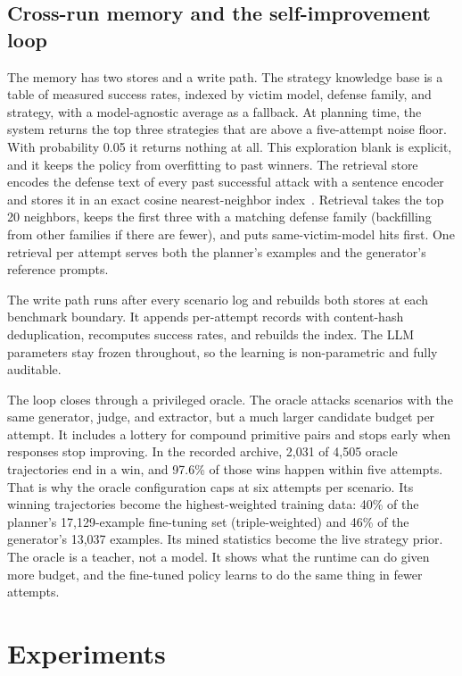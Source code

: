 \documentclass[conference]{IEEEtran}
\begin{document}
\subsection{Cross-run memory and the self-improvement loop}
\label{sec:memory}
The memory has two stores and a write path. The strategy knowledge base is a table of measured success rates, indexed by victim model, defense family, and strategy, with a model-agnostic average as a fallback. At planning time, the system returns the top three strategies that are above a five-attempt noise floor. With probability 0.05 it returns nothing at all. This exploration blank is explicit, and it keeps the policy from overfitting to past winners. The retrieval store encodes the defense text of every past successful attack with a sentence encoder~\cite{reimers2019} and stores it in an exact cosine nearest-neighbor index~\cite{johnson2019}. Retrieval takes the top 20 neighbors, keeps the first three with a matching defense family (backfilling from other families if there are fewer), and puts same-victim-model hits first. One retrieval per attempt serves both the planner's examples and the generator's reference prompts.

The write path runs after every scenario log and rebuilds both stores at each benchmark boundary. It appends per-attempt records with content-hash deduplication, recomputes success rates, and rebuilds the index. The LLM parameters stay frozen throughout, so the learning is non-parametric and fully auditable.

The loop closes through a privileged oracle. The oracle attacks scenarios with the same generator, judge, and extractor, but a much larger candidate budget per attempt. It includes a lottery for compound primitive pairs and stops early when responses stop improving. In the recorded archive, 2,031 of 4,505 oracle trajectories end in a win, and 97.6\% of those wins happen within five attempts. That is why the oracle configuration caps at six attempts per scenario. Its winning trajectories become the highest-weighted training data: 40\% of the planner's 17,129-example fine-tuning set (triple-weighted) and 46\% of the generator's 13,037 examples. Its mined statistics become the live strategy prior. The oracle is a teacher, not a model. It shows what the runtime can do given more budget, and the fine-tuned policy learns to do the same thing in fewer attempts.
\section{Experiments}
\label{sec:exp}
\end{document}
